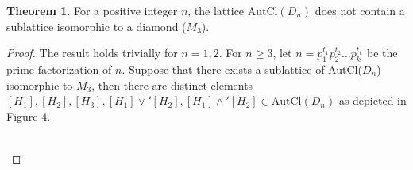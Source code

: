 \documentclass{article}
\theoremstyle{definition}
\newtheorem{theorem}{Theorem}[section]
\begin{document}
\begin{theorem}
     For a positive integer $n$, the lattice $\text{AutCl}(D_n)$ does not contain a sublattice isomorphic to a diamond ($M_3$). \end{theorem}
\begin{proof}
     The result holds trivially for $n=1,2$. For $n\ge 3$, let $n=p_1^{t_1}p_2^{t_2}\dots p_k^{t_k}$ be the prime factorization of $n$. Suppose that there exists a sublattice of AutCl($D_n$) isomorphic to $M_3$, then there are distinct elements $[H_1],[H_2],[H_3],[H_1]\vee'[H_2],[H_1]\wedge' [H_2] \in \text{AutCl}(D_n)$ as depicted in Figure 4.
\begin{figure}[h]
    \centering
        \caption{}
\end{figure}\\




\end{proof}
\end{document}
